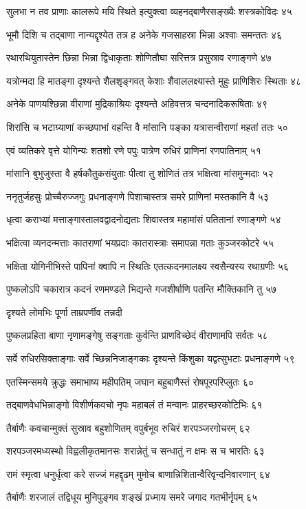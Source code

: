 सुलभा न तव प्राणाः कालरूपे मयि स्थिते
इत्युक्त्वा व्यहनद्बाणैरसङ्ख्यैः शस्त्रकोविदः ४५

भूमौ दिशि च तद्बाणा नान्यद्दृश्येत तत्र ह
अनेके गजसाहस्रा भिन्ना अश्वाः समन्ततः ४६

रथारथियुतास्तेन छिन्ना भिन्ना द्विधाकृताः
शोणितौघा सरित्तत्र प्रसुस्राव रणाङ्गणे ४७

यत्रोन्मदा हि मातङ्गा दृश्यन्ते शैलशृङ्गवत्
केशाः शैवाललक्ष्यास्ते मुहुः प्राणिशिरः स्थिताः ४८

अनेके पाणयश्छिन्ना वीराणां मुद्रिकाश्रियः
दृश्यन्ते अहिवत्तत्र चन्दनादिकरूषिताः ४९

शिरांसि च भटाग्र्याणां कच्छपाभां वहन्ति वै
मांसानि पङ्का यत्रासन्वीराणां महतां ततः ५०

एवं व्यतिकरे वृत्ते योगिन्यः शतशो रणे
पपुः पात्रेण रुधिरं प्राणिनां रणपातिनाम् ५१

मांसानि बुभुजुस्ता वै हर्षकौतुकसंयुताः
पीत्वा तु शोणितं तत्र भक्षित्वा मांसमुन्मदाः ५२

ननृतुर्जहसुः प्रोच्चैरुज्जगुः प्रधनाङ्गणे
पिशाचास्तत्र समरे प्राणिनां मस्तकानि वै ५३

धृत्वा कराभ्यां मत्ताङ्गास्तालवद्वादनोद्यताः
शिवास्तत्र महामांसं पतितानां रणाङ्गणे ५४

भक्षित्वा व्यनदन्मत्ताः कातराणां भयप्रदाः
कातरास्त्राः समापन्ना गताः कुञ्जरकोटरे ५५

भक्षिता योगिनीभिस्ते पापिनां क्वापि न स्थितिः
एतत्कदनमालक्ष्य स्वसैन्यस्य रथाग्रणीः ५६

पुष्कलोऽपि चकारात्र कदनं रणमण्डले
भिद्यन्ते गजशीर्षाणि पतन्ति मौक्तिकानि तु ५७

दृश्यते लोमभिः पूर्णा ताम्रपर्णीव तन्नदी

पुष्कलप्रहिता बाणा नृणामङ्गेषु सङ्गताः
कुर्वन्ति प्राणविच्छेदं वीराणामपि सर्वतः ५८

सर्वे रुधिरसिक्ताङ्गाः सर्वे च्छिन्ननिजाङ्गकाः
दृश्यन्ते किंशुका यद्वत्सुभटाः प्रधनाङ्गणे ५९

एतस्मिन्समये क्रुद्धः समाभाष्य महीपतिम्
जघान बहुबाणैस्तं रोषपूरपरिप्लुतः ६०

तद्बाणवेधभिन्नाङ्गो विशीर्णकवचो नृपः
महाबलं तं मन्वानः प्राहरच्छरकोटिभिः ६१

तैर्बाणैः कवचान्मुक्तं सुस्राव बहुशोणितम्
वपुर्बभूव रुचिरं शरपञ्जरगोचरम् ६२

शरपञ्जरमध्यस्थो विह्वलीकृतमानसः
शरान्नेतुं च सन्धातुं न क्षमः स च भारतिः ६३

रामं स्मृत्वा धनुर्धृत्वा करे सज्जं महद्दृढम्
मुमोच बाणान्निशितान्वैरिवृन्दनिवारणान् ६४

तैर्बाणैः शरजालं तद्विधूय मुनिपुङ्गव
शङ्खं प्रध्माय समरे जगाद गतभीर्नृपम् ६५

